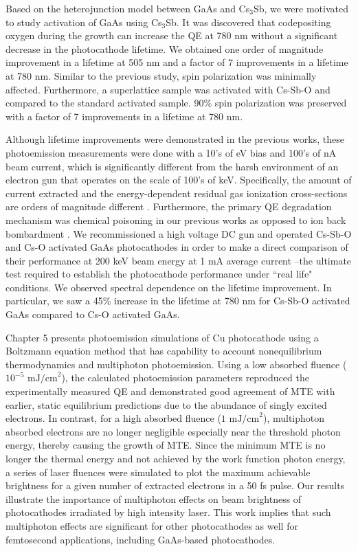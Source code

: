 Based on the heterojunction model between GaAs and Cs$_3$Sb, we were motivated to study activation of GaAs using Cs$_3$Sb. It was discovered that codepositing oxygen during the growth can increase the QE at 780 nm without a significant decrease in the photocathode lifetime. We obtained one order of magnitude improvement in a lifetime at 505 nm and a factor of 7 improvements in a lifetime at 780 nm. Similar to the previous study, spin polarization was minimally affected. Furthermore, a superlattice sample was activated with Cs-Sb-O and compared to the standard activated sample. 90\% spin polarization was preserved with a factor of 7 improvements in a lifetime at 780 nm.

Although lifetime improvements were demonstrated in the previous works, these photoemission measurements were done with a 10's of eV bias and 100's of nA beam current, which is significantly different from the harsh environment of an electron gun that operates on the scale of 100's of keV. Specifically, the amount of current extracted and the energy-dependent residual gas ionization cross-sections are orders of magnitude different \cite{grames2011_ChargeFluenceLifetime}. Furthermore, the primary QE degradation mechanism was chemical poisoning in our previous works as opposed to ion back bombardment \cite{cultrera2020_LongLifetimePolarized}.
We recommissioned a high voltage DC gun and operated Cs-Sb-O and Cs-O activated GaAs photocathodes in order to make a direct comparison of their performance at 200 keV beam energy at 1 mA average current --the ultimate test required to establish the photocathode performance under ``real life" conditions.
We observed spectral dependence on the lifetime improvement.
In particular, we saw a 45\% increase in the lifetime at 780 nm for Cs-Sb-O activated GaAs compared to Cs-O activated GaAs.

Chapter 5 presents photoemission simulations of Cu photocathode using a Boltzmann equation method that has capability to account nonequilibrium thermodynamics and multiphoton photoemission. Using a low absorbed fluence ($10^{-5} \textrm{ mJ/cm}^2$), the calculated photoemission parameters reproduced the experimentally measured QE and demonstrated good agreement of MTE with earlier, static equilibrium predictions due to the abundance of singly excited electrons. In contrast, for a high absorbed fluence ($1 \textrm{ mJ/cm}^2$), multiphoton absorbed electrons are no longer negligible especially near the threshold photon energy, thereby causing the growth of MTE. Since the minimum MTE is no longer the thermal energy and not achieved by the work function photon energy, a series of laser fluences were simulated to plot the maximum achievable brightness for a given number of extracted electrons in a 50 fs pulse. Our results illustrate the importance of multiphoton effects on beam brightness of photocathodes irradiated by high intensity laser.
This work implies that such multiphoton effects are significant for other photocathodes as well for femtosecond applications, including GaAs-based photocathodes. 